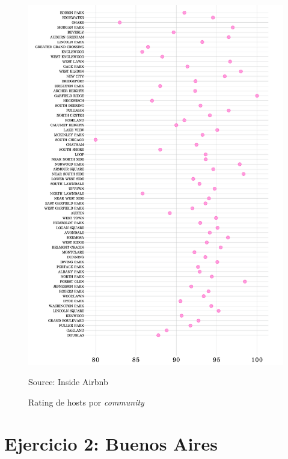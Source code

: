 \documentclass[11pt]{article}
\newcommand{\source}[1]{\caption*{Source: {#1}} }
\begin{document}
\begin{figure}[H]
    \centering
    \caption{Rating de hosts por \textit{community}}
    \includegraphics[scale=0.7]{grafico 3 airbnb.png}
    \source{Inside Airbnb}
    \label{fig:3}
\end{figure}

\section*{Ejercicio 2: Buenos Aires} 
\end{document}
